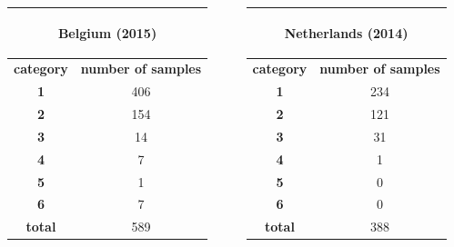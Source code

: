 \documentclass[c]{beamer}
\begin{document}
\begin{frame}
\begin{itemize}
{\begin{columns}
\begin{column}{0.33\textwidth}
\begin{table}
\begin{center}
\begin{adjustbox}{max width=0.5\textwidth}
\begin{tabular}{|c|c|}
      \hline
      \multicolumn{2}{|c|}{\begin{bf}Belgium (2015)\end{bf}} \\
      \hline
      \textbf{category} & \textbf{number of samples}\\
      \hline
      \textbf{1} & 406\\
      \hline
      \textbf{2} & 154\\
      \hline
      \textbf{3} & 14\\
      \hline
      \textbf{4} & 7\\
      \hline
      \textbf{5} & 1\\
      \hline
      \textbf{6} & 7\\
      \hline
      \textbf{total} & 589\\
      \hline
    \end{tabular}
   \end{adjustbox}
   \end{center}
   \end{table}
  \end{column}
  \begin{column}{0.33\textwidth}
   \begin{table}
   \begin{center}
   \begin{adjustbox}{max width=0.5\textwidth}
    \begin{tabular}{|c|c|}
      \hline
      \multicolumn{2}{|c|}{\begin{bf}Netherlands (2014)\end{bf}} \\
      \hline
      \textbf{category} & \textbf{number of samples}\\
      \hline
      \textbf{1} & 234\\
      \hline
      \textbf{2} & 121\\
      \hline
      \textbf{3} & 31\\
      \hline
      \textbf{4} & 1\\
      \hline
      \textbf{5} & 0\\
      \hline
      \textbf{6} & 0 \\
      \hline
      \textbf{total} & 388\\
      \hline
    \end{tabular}
   \end{adjustbox}
   \end{center}
   \end{table}
  \end{column}

\end{columns}}
\end{itemize}
\end{frame}
\end{document}
